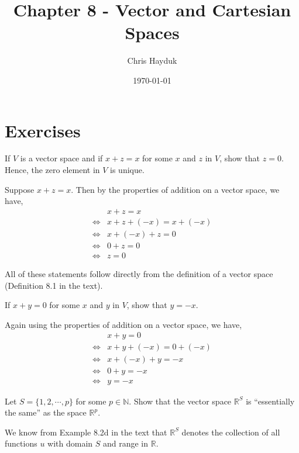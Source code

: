 \documentclass[12pt]{article}
\newenvironment{problem}[2][Problem]{\begin{trivlist}
\item[\hskip \labelsep {\bfseries #1}\hskip \labelsep {\bfseries #2.}]}{\end{trivlist}}
\begin{document}
\title{Chapter 8 - Vector and Cartesian Spaces}

\author{Chris Hayduk}
\date{\today}

\maketitle

\section{Exercises}

\begin{problem}{8.A} If $V$ is a vector space and if $x + z = x$ for some $x$ and $z$ in $V$, show that $z = 0$. Hence, the zero element in $V$ is unique.
\end{problem}

Suppose $x + z = x$. Then by the properties of addition on a vector space, we have,
\begin{align*}
&x + z = x\\
\iff &x + z + (-x) = x + (-x)\\
\iff &x + (-x) + z  = 0\\
\iff &0 + z = 0\\
\iff &z = 0
\end{align*}

All of these statements follow directly from the definition of a vector space (Definition 8.1 in the text).

\begin{problem}{8.B} If $x + y = 0$ for some $x$ and $y$ in $V$, show that $y = -x$.
\end{problem}

Again using the properties of addition on a vector space, we have,
\begin{align*}
&x + y = 0\\
\iff &x + y + (-x) = 0 + (-x)\\
\iff &x + (-x) + y  = -x\\
\iff &0 + y = -x\\
\iff &y = -x
\end{align*}

\begin{problem}{8.C} Let $S = \{1, 2, \cdots, p\}$ for some $p \in \mathbb{N}$. Show that the vector space $\mathbb{R}^S$ is ``essentially the same'' as the space $\mathbb{R}^p$.
\end{problem}

We know from Example 8.2d in the text that $\mathbb{R}^S$ denotes the collection of all functions $u$ with domain $S$ and range in $\mathbb{R}$.\\
\end{document}
